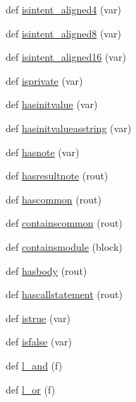 \begin{DoxyCompactItemize}
\item 
def \hyperlink{namespacenumpy_1_1f2py_1_1auxfuncs_af32cc4d1776b6a9dd3fde6201165d701}{isintent\+\_\+aligned4} (var)
\item 
def \hyperlink{namespacenumpy_1_1f2py_1_1auxfuncs_a2f9154d164235a58e99258803bbfedd5}{isintent\+\_\+aligned8} (var)
\item 
def \hyperlink{namespacenumpy_1_1f2py_1_1auxfuncs_a5a074af72914c938f4ac2efaa538a575}{isintent\+\_\+aligned16} (var)
\item 
def \hyperlink{namespacenumpy_1_1f2py_1_1auxfuncs_a6803baf5a661c0532a5ddeb2ee800233}{isprivate} (var)
\item 
def \hyperlink{namespacenumpy_1_1f2py_1_1auxfuncs_abef0776df83d4aa6f49d13a4cfbb0a81}{hasinitvalue} (var)
\item 
def \hyperlink{namespacenumpy_1_1f2py_1_1auxfuncs_a838226fbbb900d1c8eef9a07474ce396}{hasinitvalueasstring} (var)
\item 
def \hyperlink{namespacenumpy_1_1f2py_1_1auxfuncs_a610b14d14e13198a12fc8852ba272f2f}{hasnote} (var)
\item 
def \hyperlink{namespacenumpy_1_1f2py_1_1auxfuncs_a264b869b2138f2f3e4d1e4d3ab589bfa}{hasresultnote} (rout)
\item 
def \hyperlink{namespacenumpy_1_1f2py_1_1auxfuncs_a2d4b6467eb24a9aef67386ab7a307ec0}{hascommon} (rout)
\item 
def \hyperlink{namespacenumpy_1_1f2py_1_1auxfuncs_a7bcaaf5fb3a5742c8d9897ac7c03683b}{containscommon} (rout)
\item 
def \hyperlink{namespacenumpy_1_1f2py_1_1auxfuncs_a87763c42d1bb431e5dee6a9b76db8388}{containsmodule} (block)
\item 
def \hyperlink{namespacenumpy_1_1f2py_1_1auxfuncs_adf16d167954b191c63e730ad01fea4be}{hasbody} (rout)
\item 
def \hyperlink{namespacenumpy_1_1f2py_1_1auxfuncs_aec598fdcfc97d6d93fd3b5dc5b1e1bb9}{hascallstatement} (rout)
\item 
def \hyperlink{namespacenumpy_1_1f2py_1_1auxfuncs_a932cfb1360e2fe1f49f3a42238d99479}{istrue} (var)
\item 
def \hyperlink{namespacenumpy_1_1f2py_1_1auxfuncs_aea11856d1075d968e436e68c80b4fc43}{isfalse} (var)
\item 
def \hyperlink{namespacenumpy_1_1f2py_1_1auxfuncs_a8afb32159fb67b2e5c6cfae947d5bb05}{l\+\_\+and} (f)
\item 
def \hyperlink{namespacenumpy_1_1f2py_1_1auxfuncs_a219e9d65e3dacb2851be6c42c386db42}{l\+\_\+or} (f)

\end{DoxyCompactItemize}
